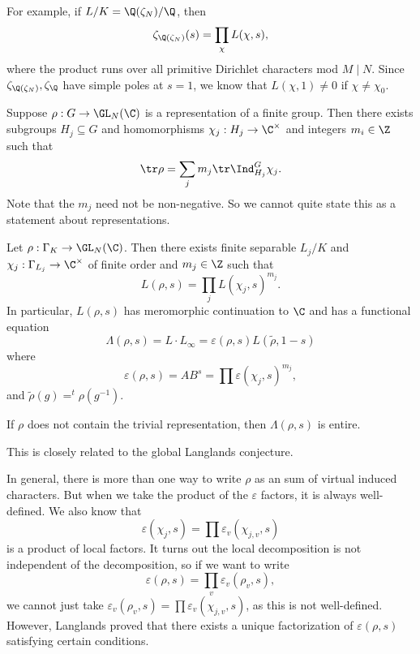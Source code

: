 \documentclass[a4paper]{article}
\begin{document}
\begin{eg}
  For example, if $L/K = \Q(\zeta_N)/\Q$, then
  \[
    \zeta_{\Q(\zeta_N)}(s) = \prod_{\chi} L(\chi, s),
  \]
  where the product runs over all primitive Dirichlet characters mod $M \mid N$. Since $\zeta_{\Q(\zeta_N)}, \zeta_\Q$ have simple poles at $s = 1$, we know that $L(\chi, 1) \not= 0$ if $\chi \not= \chi_0$.
\end{eg}

\begin{thm}
  Suppose $\rho: G \to \GL_N(\C)$ is a representation of a finite group. Then there exists subgroups $H_j \subseteq G$ and homomorphisms $\chi_j: H_j \to \C^\times$ and integers $m_i \in \Z$ such that
  \[
    \tr \rho = \sum_j m_j \tr \Ind_{H_j}^G \chi_j.
  \]
  Note that the $m_j$ need not be non-negative. So we cannot quite state this as a statement about representations.
\end{thm}

\begin{cor}
  Let $\rho: \Gamma_K \to \GL_N(\C)$. Then there exists finite separable $L_j/K$ and $\chi_j: \Gamma_{L_j} \to \C^\times$ of finite order and $m_j \in \Z$ such that
  \[
    L(\rho, s) = \prod_j L(\chi_j, s)^{m_j}.
  \]
  In particular, $L(\rho, s)$ has meromorphic continuation to $\C$ and has a functional equation
  \[
    \Lambda(\rho, s) = L \cdot L_\infty = \varepsilon(\rho, s) L(\tilde{\rho}, 1 - s)
  \]
  where
  \[
    \varepsilon(\rho, s) = A B^s = \prod \varepsilon(\chi_j, s)^{m_j},
  \]
  and $\tilde{\rho}(g) = ^t \rho(g^{-1})$.
\end{cor}

\begin{conjecture}
  If $\rho$ does not contain the trivial representation, then $\Lambda(\rho, s)$ is entire.
\end{conjecture}
This is closely related to the global Langlands conjecture.

In general, there is more than one way to write $\rho$ as an sum of virtual induced characters. But when we take the product of the $\varepsilon$ factors, it is always well-defined. We also know that
\[
  \varepsilon(\chi_j, s) = \prod \varepsilon_v(\chi_{j, v}, s)
\]
is a product of local factors. It turns out the local decomposition is not independent of the decomposition, so if we want to write
\[
  \varepsilon(\rho, s) = \prod_v \varepsilon_v(\rho_v, s),
\]
we cannot just take $\varepsilon_v(\rho_v, s) = \prod \varepsilon_v(\chi_{j, v}, s)$, as this is not well-defined. However, Langlands proved that there exists a unique factorization of $\varepsilon(\rho, s)$ satisfying certain conditions.
\end{document}
